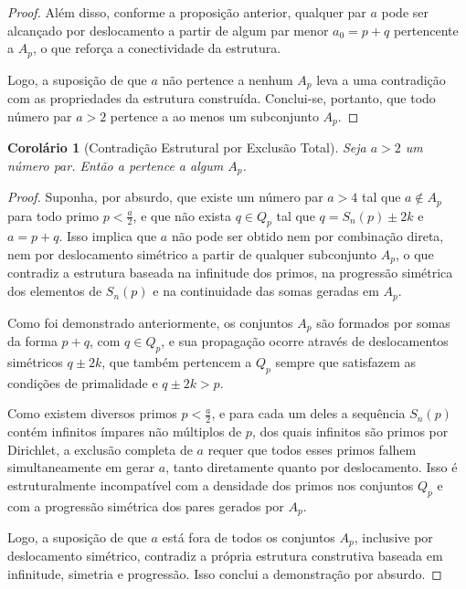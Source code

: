 \documentclass[a4paper,11pt]{article}
\newtheorem{corollary}[theorem]{Corolário}
\theoremstyle{definition}
\theoremstyle{remark}
\begin{document}
\begin{otherlanguage}{brazil}
\begin{proof}
		Além disso, conforme a proposição anterior, qualquer par \(a\) pode ser alcançado por deslocamento a partir de algum par menor \(a_0 = p + q\) pertencente a \(A_p\), o que reforça a conectividade da estrutura.
		
		Logo, a suposição de que \(a\) não pertence a nenhum \(A_p\) leva a uma contradição com as propriedades da estrutura construída. Conclui-se, portanto, que todo número par \(a > 2\) pertence a ao menos um subconjunto \(A_p\).
	\end{proof}
	
	\begin{corollary}[Contradição Estrutural por Exclusão Total]\label{coro:contradicao_estrutural}
		Seja \(a > 2\) um número par. Então a pertence a algum \(A_p\).
	\end{corollary}
	
	\begin{proof}
		Suponha, por absurdo, que existe um número par \(a > 4\) tal que \(a \notin A_p\) para todo primo \(p < \frac{a}{2}\), e que não exista \(q \in Q_p\) tal que \(q = S_n(p) \pm 2k\) e \(a = p + q\). Isso implica que \(a\) não pode ser obtido nem por combinação direta, nem por deslocamento simétrico a partir de qualquer subconjunto \(A_p\), o que contradiz a estrutura baseada na infinitude dos primos, na progressão simétrica dos elementos de \(S_n(p)\) e na continuidade das somas geradas em \(A_p\).
		
		Como foi demonstrado anteriormente, os conjuntos \(A_p\) são formados por somas da forma \(p + q\), com \(q \in Q_p\), e sua propagação ocorre através de deslocamentos simétricos \(q \pm 2k\), que também pertencem a \(Q_p\) sempre que satisfazem as condições de primalidade e \(q \pm 2k > p\).
		
		Como existem diversos primos \(p < \frac{a}{2}\), e para cada um deles a sequência \(S_n(p)\) contém infinitos ímpares não múltiplos de \(p\), dos quais infinitos são primos por Dirichlet, a exclusão completa de \(a\) requer que todos esses primos falhem simultaneamente em gerar \(a\), tanto diretamente quanto por deslocamento. Isso é estruturalmente incompatível com a densidade dos primos nos conjuntos \(Q_p\) e com a progressão simétrica dos pares gerados por \(A_p\).
		
		Logo, a suposição de que \(a\) está fora de todos os conjuntos \(A_p\), inclusive por deslocamento simétrico, contradiz a própria estrutura construtiva baseada em infinitude, simetria e progressão. Isso conclui a demonstração por absurdo.
	\end{proof}
	

\end{otherlanguage}
\end{document}
